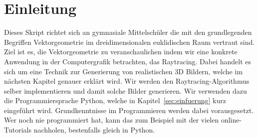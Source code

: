\section*{Einleitung}
Dieses Skript richtet sich an gymnasiale Mittelschüler die mit den grundlegenden Begriffen Vektorgeometrie im dreidimensionalen euklidischen Raum vertraut sind.
Ziel ist es, die Vektorgeometrie zu veranschaulichen indem wir eine konkrete Anwendung in der Computergrafik betrachten, das Raytracing.
Dabei handelt es sich um eine Technik zur Generierung von realistischen 3D Bildern, welche im nächsten Kapitel genauer erklärt wird.
Wir werden den Raytracing-Algorithmus selber implementieren und damit solche Bilder generieren.
Wir verwenden dazu die Programmiersprache Python, welche in Kapitel~\ref{sec:einfuerung} kurz eingeführt wird.
Grundkenntnisse im Programmieren werden dabei vorausgesetzt.
Wer noch nie programmiert hat, kann das zum Beispiel mit der vielen online-Tutorials nachholen, bestenfalls gleich in Python.
